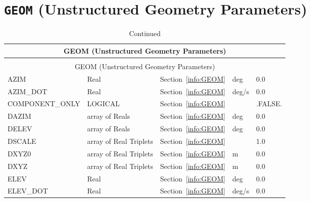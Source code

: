 \documentclass[12pt]{article}
\begin{document}
\vspace{\baselineskip}

\section{\texorpdfstring{{\tt GEOM}}{GEOM} (Unstructured Geometry Parameters)}

\begin{longtable}{@{\extracolsep{\fill}}|l|l|l|l|l|}
\caption[Unstructured geometry parameters ({\ct GEOM} namelist group)]{For more information see Section~\ref{info:GEOM}.}
\label{tbl:GEOM} \\
\hline
\multicolumn{5}{|c|}{{\ct GEOM} (Unstructured Geometry Parameters)} \\
\hline \hline
\endfirsthead
\caption[]{Continued} \\
\hline
\multicolumn{5}{|c|}{{\ct GEOM} (Unstructured Geometry Parameters)} \\
\hline \hline
\endhead
{\ct AZIM}         & Real                   & Section~\ref{info:GEOM}            &  deg      &    0.0                   \\ \hline
{\ct AZIM\_DOT}    & Real                   & Section~\ref{info:GEOM}            &  deg/s    &    0.0                   \\ \hline
{\ct COMPONENT\_ONLY} & LOGICAL             & Section~\ref{info:GEOM}            &           &  {\ct .FALSE.}           \\ \hline
{\ct DAZIM}        & array of Reals         & Section~\ref{info:GEOM}            &  deg      &    0.0                   \\ \hline
{\ct DELEV}        & array of Reals         & Section~\ref{info:GEOM}            &  deg      &    0.0                   \\ \hline
{\ct DSCALE}       & array of Real Triplets & Section~\ref{info:GEOM}            &           &   1.0                    \\ \hline
{\ct DXYZ0}        & array of Real Triplets & Section~\ref{info:GEOM}            &   m       &   0.0                    \\ \hline
{\ct DXYZ}         & array of Real Triplets & Section~\ref{info:GEOM}            &   m       &   0.0                    \\ \hline
{\ct ELEV}         & Real                   & Section~\ref{info:GEOM}            &  deg      &    0.0                   \\ \hline
{\ct ELEV\_DOT}    & Real                   & Section~\ref{info:GEOM}            &  deg/s    &    0.0                   \\ \hline

\end{longtable}
\end{document}
